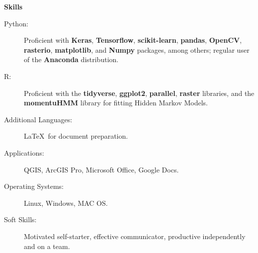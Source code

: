 \documentclass[letterpaper,11pt]{article}
\newcommand{\resheading}[1]{{\large \colorbox{mygrey}{\begin{minipage}{\textwidth}{\textbf{#1 \vphantom{p\^{E}}}}\end{minipage}}}}
\begin{document}
\resheading{Skills}
	\begin{description}
        \item[Python:] {\footnotesize Proficient with \textbf{Keras}, \textbf{Tensorflow}, \textbf{scikit-learn}, \textbf{pandas}, \textbf{OpenCV}, \textbf{rasterio}, \textbf{matplotlib}, and \textbf{Numpy} packages, among others; regular user of the \textbf{Anaconda} distribution.}
        
        \item[R:] { \footnotesize Proficient with the \textbf{tidyverse}, \textbf{ggplot2}, \textbf{parallel}, \textbf{raster} libraries, and the \textbf{momentuHMM} library for fitting Hidden Markov Models.}
        	
		\item[Additional Languages:] {\footnotesize \LaTeX \, for document preparation.}
		
		\item[Applications:]{\footnotesize QGIS, ArcGIS Pro, Microsoft Office, Google Docs.}
		
        \item[Operating Systems:] {\footnotesize Linux, Windows, MAC OS}.
        
        \item[Soft Skills:] {\footnotesize Motivated self-starter, effective communicator, productive independently and on a team.}
	\end{description}
\end{document}
